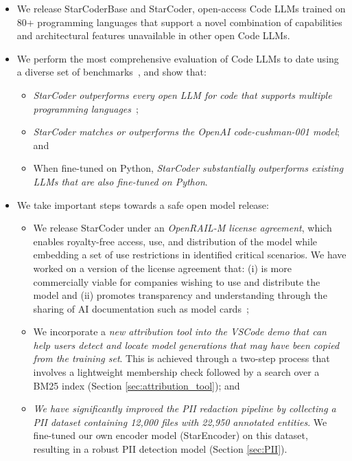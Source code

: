 \begin{itemize}
    \item We release StarCoderBase and StarCoder, open-access Code LLMs trained on 80+ programming languages that support a novel combination of capabilities and architectural features unavailable in other open Code LLMs.
    \item We perform the most comprehensive evaluation of Code LLMs to date using a diverse set of benchmarks~\citep{Lai2022DS1000,cassano2022multiple,pearce2022copilotsec,fried2022incoder,yee:typeweaver,austin2021program,chen2021codex,bigcode-evaluation-harness,hendrycks2020mmlu,reddy2019coqa,cobbe2021training, nadeem_stereoset_2021,gehman_realtoxicityprompts_2020,liang2022helm}, and show that:
    \begin{itemize}
        \item \emph{StarCoder outperforms every open LLM for code that supports multiple programming languages}~\citep{nijkamp:codegen,qinkai:codegeex};
        \item \emph{StarCoder matches or outperforms the OpenAI code-cushman-001 model}; and \item When fine-tuned on Python, \emph{StarCoder substantially outperforms existing LLMs that are also fine-tuned on Python}. 

    \end{itemize}
    \item We take important steps towards a safe open model release: 
    \begin{itemize}
        \item We release StarCoder under an \emph{OpenRAIL-M license agreement}, which enables royalty-free access, use, and distribution of the model while embedding a set of use restrictions in identified critical scenarios. We have worked on a version of the license agreement that: (i) is more commercially viable for companies wishing to use and distribute the model and (ii) promotes transparency and understanding through the sharing of AI documentation such as model cards~\citep{mitchell2019modelcard};
        \item We incorporate a \emph{new attribution tool into the VSCode demo that can help users detect and locate model generations that may have been copied from the training set}. This is achieved through a two-step process that involves a lightweight membership check followed by a search over a BM25 index (Section \ref{sec:attribution_tool}); and \item \emph{We have significantly improved the PII redaction pipeline by collecting a PII dataset containing 12,000 files with 22,950 annotated entities}. We fine-tuned our own encoder model (StarEncoder) on this dataset, resulting in a robust PII detection model (Section \ref{sec:PII}). 

    \end{itemize}
\end{itemize}

